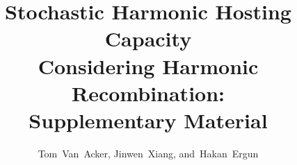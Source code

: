 \documentclass[journal]{IEEEtran}
\begin{document}
\title{Stochastic Harmonic Hosting Capacity \\ Considering Harmonic Recombination: \\ Supplementary Material}
\author{Tom~Van~Acker, Jinwen~Xiang, and~Hakan~Ergun}
\maketitle



\end{document}
